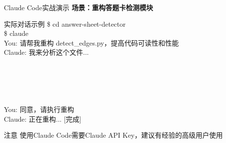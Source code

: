 \begin{frame}{Claude Code实战演示}
	\textbf{场景：重构答题卡检测模块}
	
	\vspace{0.3cm}

	\begin{block}{实际对话示例}
		\small
		\$ cd answer-sheet-detector
		\\
		\$ claude
		\\
		You: 请帮我重构 detect\_edges.py，提高代码可读性和性能
		\\
		Claude: 我来分析这个文件... \\
		\indent{[分析当前代码结构]} \\
		\indent{[提出重构建议]} \\
		 \\
		 \\
		\\
		You: 同意，请执行重构
		\\
		Claude: 正在重构... [完成]
	\end{block}

	\vspace{0.3cm}

	\begin{alertblock}{注意}
		使用Claude Code需要Claude API Key，建议有经验的高级用户使用
	\end{alertblock}
\end{frame}


